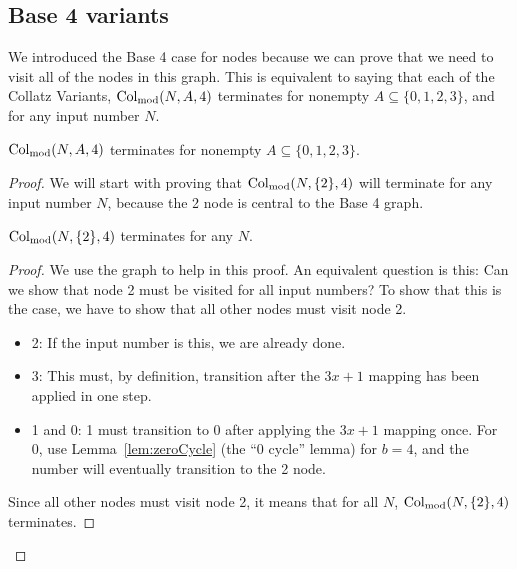 \subsection{Base 4 variants} \label{subsubsec:base4variants}
We introduced the Base 4 case for nodes because we can prove that we need to visit all of the nodes in this graph. This is equivalent to saying that each of the Collatz Variants, $\mathrm{Col}_{\text{mod}}(N,A,4)$ terminates for nonempty $A \subseteq \{0,1,2,3\}$, and for any input number $N$. 
\begin{theorem}
$\mathrm{Col}_{\text{mod}}(N,A,4)$ terminates for nonempty $A \subseteq \{0,1,2,3\}$.
\end{theorem}
\begin{proof}
We will start with proving that $\mathrm{Col}_{\text{mod}}(N,\{2\},4)$ will terminate for any input number $N$, because the 2 node is central to the Base 4 graph.\par
\begin{lemma}
\label{lem:collatzSubTwoModFour}
$\mathrm{Col}_{\text{mod}}(N,\{2\},4)$ terminates for any $N$.
\end{lemma} 
\begin{proof}
We use the graph to help in this proof. An equivalent question is this: Can we show that node 2 must be visited for all input numbers? To show that this is the case, we have to show that all other nodes must visit node 2. 
\begin{itemize}
    \item 2: If the input number is this, we are already done.
    \item 3: This must, by definition, transition after the $3x+1$ mapping has been applied in one step.
    \item 1 and 0: 1 must transition to 0 after applying the $3x+1$ mapping once. For 0, use Lemma~\ref{lem:zeroCycle} (the ``0 cycle'' lemma) for $b = 4$, and the number will eventually transition to the 2 node.
\end{itemize}
Since all other nodes must visit node 2, it means that for all $N$, $\mathrm{Col}_{\text{mod}}(N,\{2\},4)$ terminates.
\end{proof} \par


\end{proof}
